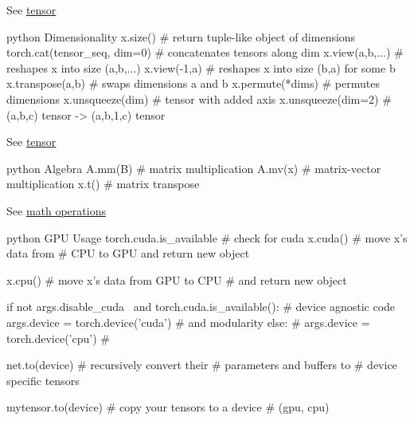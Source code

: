 \documentclass[8pt]{extarticle}
\begin{document}
\begin{multicols}{2}
See \href{https://pytorch.org/docs/stable/tensors.html}{tensor}

\begin{codebox}{python}{\hypertarget{dimensionality}{%
Dimensionality\label{dimensionality}}}
x.size()                        # return tuple-like object of dimensions
torch.cat(tensor_seq, dim=0)    # concatenates tensors along dim
x.view(a,b,...)                 # reshapes x into size (a,b,...)
x.view(-1,a)                    # reshapes x into size (b,a) for some b
x.transpose(a,b)                # swaps dimensions a and b
x.permute(*dims)                # permutes dimensions
x.unsqueeze(dim)                # tensor with added axis
x.unsqueeze(dim=2)              # (a,b,c) tensor -> (a,b,1,c) tensor
\end{codebox}

See \href{https://pytorch.org/docs/stable/tensors.html}{tensor}

\begin{codebox}{python}{\hypertarget{algebra}{%
Algebra\label{algebra}}}
A.mm(B)     # matrix multiplication
A.mv(x)     # matrix-vector multiplication
x.t()       # matrix transpose
\end{codebox}

See
\href{https://pytorch.org/docs/stable/torch.html?highlight=mm\#math-operations}{math
operations}

\begin{codebox}{python}{\hypertarget{gpu-usage}{%
GPU Usage\label{gpu-usage}}}
torch.cuda.is_available                 # check for cuda
x.cuda()                                # move x's data from
                                        # CPU to GPU and return new object

x.cpu()                                 # move x's data from GPU to CPU
                                        # and return new object

if not args.disable_cuda \
    and torch.cuda.is_available():      # device agnostic code
    args.device = torch.device('cuda')  # and modularity
else:                                   #
    args.device = torch.device('cpu')   #

net.to(device)                          # recursively convert their
                                        # parameters and buffers to
                                        # device specific tensors

mytensor.to(device)                     # copy your tensors to a device
                                        # (gpu, cpu)
\end{codebox}


\end{multicols}
\end{document}
